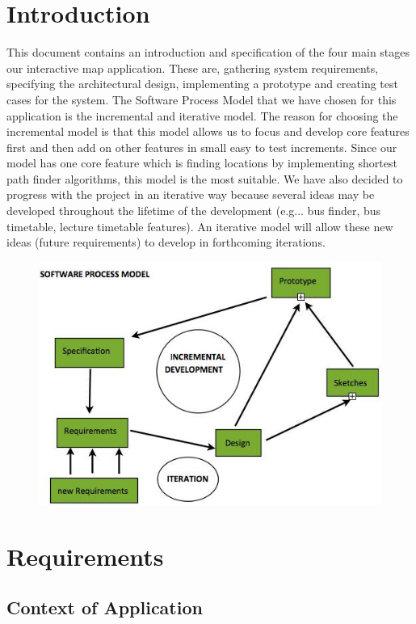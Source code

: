 \documentclass[10pt,a4paper,oneside]{report}
\begin{document}
\section*{Introduction}
This document contains an introduction and specification of the four main stages our interactive map application. These are, gathering system requirements, specifying the architectural design, implementing a prototype and creating test cases for the system.
The Software Process Model that we have chosen for this application is the incremental and iterative model. The reason for choosing the incremental model is that this model allows us to focus and develop core features first and then add on other features in small easy to test increments. Since our model has one core feature which is finding locations by implementing shortest path finder algorithms, this model is the most suitable. We have also decided to progress with the project in an iterative way because several ideas may be developed throughout the lifetime of the development (e.g... bus finder, bus timetable, lecture timetable features).  An iterative model will allow these new ideas (future requirements) to develop in forthcoming iterations.
\begin{figure}[H]
 \centering
 \includegraphics[keepaspectratio, width=\textwidth]{spm.png}
\end{figure}

\section*{Requirements}
\subsection*{Context of Application}
\end{document}
